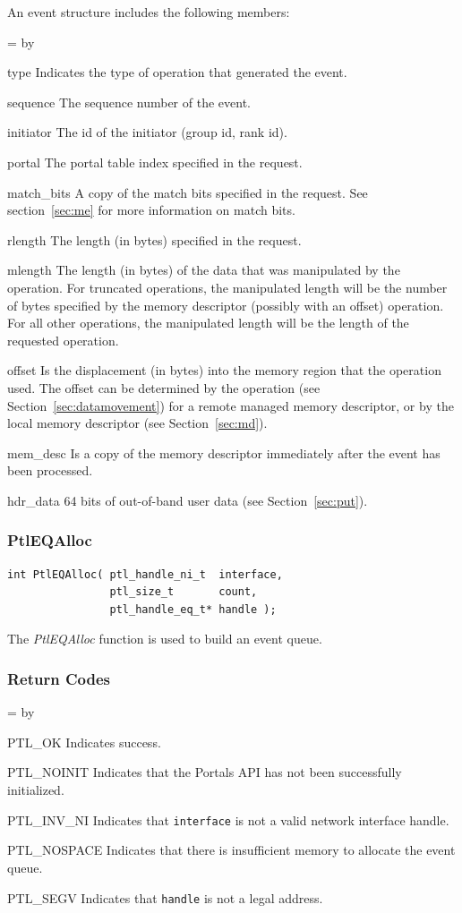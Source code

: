 \documentclass{sand-report}
\newcommand{\retlabel}[1]{\mbox{\texttt{#1}}\hfil}
\newenvironment{returns}%
  {\begin{list}{}%
      {\renewcommand{\makelabel}{\retlabel}%
        \topsep=0.0pt%
        \labelwidth=1.25in%
        \leftmargin=\labelwidth%
        \advance \leftmargin by \labelsep%
        \setlength{\itemsep}{.5\smallskipamount}%
        \setlength{\parsep}{0pt}}%
      }%
  {\end{list}}
\begin{document}
\noindent
An event structure includes the following members:
\begin{returns}
\item[type] Indicates the type of operation that generated the event.
\item[sequence] The sequence number of the event.
\item[initiator] The id of the initiator (group id, rank id).
\item[portal] The portal table index specified in the request.
\item[match_bits] A copy of the match bits specified in the request.
  See section~\ref{sec:me} for more information on match bits.
\item[rlength] The length (in bytes) specified in the request.
\item[mlength] The length (in bytes) of the data that was manipulated
  by the operation.  For truncated operations, the manipulated length
  will be the number of bytes specified by the memory descriptor
  (possibly with an offset) operation.  For all other operations, the
  manipulated length will be the length of the requested operation.
\item[offset] Is the displacement (in bytes) into the memory region
  that the operation used.  The offset can be determined by the
  operation (see Section~\ref{sec:datamovement}) for a remote managed
  memory descriptor, or by the local memory descriptor (see
  Section~\ref{sec:md}).
\item[mem_desc] Is a copy of the memory descriptor immediately after
  the event has been processed.
\item[hdr_data] 64 bits of out-of-band user data (see
  Section~\ref{sec:put}).
\end{returns}

\subsubsection{PtlEQAlloc}\label{sec:eqalloc}
\begin{verbatim}
int PtlEQAlloc( ptl_handle_ni_t  interface,
                ptl_size_t       count,
                ptl_handle_eq_t* handle );
\end{verbatim}

\noindent
The \emph{PtlEQAlloc} function is used to build an event queue.
\subsubsection*{Return Codes}
\begin{returns}
\item[PTL_OK] Indicates success.
\item[PTL_NOINIT] Indicates that the Portals API has not been
  successfully initialized.
\item[PTL_INV_NI] Indicates that \texttt{interface} is not a valid
  network interface handle.
\item[PTL_NOSPACE] Indicates that there is insufficient memory to
  allocate the event queue.
\item[PTL_SEGV] Indicates that \texttt{handle} is not a legal address.
\end{returns}
\end{document}
